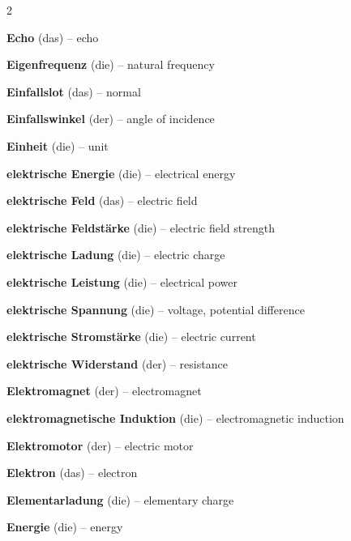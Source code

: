 \begin{multicols}{2}
\par\nopagebreak
\textbf{Echo} (das) -- echo\dotfill\hyperref[e:217]{\pageref*{e:217}}\par
\textbf{Eigenfrequenz} (die) -- natural frequency\dotfill\hyperref[e:199]{\pageref*{e:199}}\par
\textbf{Einfallslot} (das) -- normal\dotfill\hyperref[e:229]{\pageref*{e:229}}\par
\textbf{Einfallswinkel} (der) -- angle of incidence\dotfill\hyperref[e:230]{\pageref*{e:230}}\par
\textbf{Einheit} (die) -- unit\dotfill\hyperref[e:3]{\pageref*{e:3}}\par
\textbf{elektrische Energie} (die) -- electrical energy\dotfill\hyperref[e:101]{\pageref*{e:101}}\par
\textbf{elektrische Feld} (das) -- electric field\dotfill\hyperref[e:171]{\pageref*{e:171}}\par
\textbf{elektrische Feldstärke} (die) -- electric field strength\dotfill\hyperref[e:172]{\pageref*{e:172}}\par
\textbf{elektrische Ladung} (die) -- electric charge\dotfill\hyperref[e:143]{\pageref*{e:143}}\par
\textbf{elektrische Leistung} (die) -- electrical power\dotfill\hyperref[e:168]{\pageref*{e:168}}\par
\textbf{elektrische Spannung} (die) -- voltage, potential difference\dotfill\hyperref[e:145]{\pageref*{e:145}}\par
\textbf{elektrische Stromstärke} (die) -- electric current\dotfill\hyperref[e:144]{\pageref*{e:144}}\par
\textbf{elektrische Widerstand} (der) -- resistance\dotfill\hyperref[e:146]{\pageref*{e:146}}\par
\textbf{Elektromagnet} (der) -- electromagnet\dotfill\hyperref[e:176]{\pageref*{e:176}}\par
\textbf{elektromagnetische Induktion} (die) -- electromagnetic induction\dotfill\hyperref[e:184]{\pageref*{e:184}}\par
\textbf{Elektromotor} (der) -- electric motor\dotfill\hyperref[e:186]{\pageref*{e:186}}\par
\textbf{Elektron} (das) -- electron\dotfill\hyperref[e:262]{\pageref*{e:262}}\par
\textbf{Elementarladung} (die) -- elementary charge\dotfill\hyperref[e:266]{\pageref*{e:266}}\par
\textbf{Energie} (die) -- energy\dotfill\hyperref[e:95]{\pageref*{e:95}}\par

\end{multicols}
